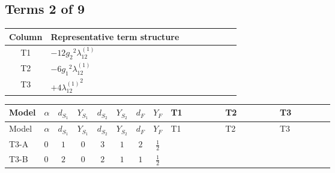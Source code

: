 \documentclass[8pt]{article}
\begin{document}
\begin{landscape}
\subsection*{Terms 2 of 9}
\begin{center}
\begin{tabular}{@{}c >{\raggedright\arraybackslash}p{0.82\linewidth}@{}}
\toprule
Column & Representative term structure \\
\midrule
T1 & \(\displaystyle -12 {g_2}^2 {\lambda_{12}^{(1)}}\) \\
\midrule
T2 & \(\displaystyle -6 {g_1}^2 {\lambda_{12}^{(1)}}\) \\
\midrule
T3 & \(\displaystyle +4 {\lambda_{12}^{(1)}}^2\) \\
\midrule
\bottomrule
\end{tabular}
\end{center}
\smallskip
\tiny
\begin{longtable}{@{}llcccccc >{\raggedright\arraybackslash}p{0.21\linewidth} >{\raggedright\arraybackslash}p{0.21\linewidth} >{\raggedright\arraybackslash}p{0.21\linewidth}@{}}
\toprule
Model & $\alpha$ & $d_{S_1}$ & $Y_{S_1}$ & $d_{S_2}$ & $Y_{S_2}$ & $d_F$ & $Y_F$ & T1 & T2 & T3 \\
\midrule
\endfirsthead
\toprule
Model & $\alpha$ & $d_{S_1}$ & $Y_{S_1}$ & $d_{S_2}$ & $Y_{S_2}$ & $d_F$ & $Y_F$ & T1 & T2 & T3 \\
\midrule
\endhead
T3-A & $0$ & $1$ & $0$ & $3$ & $1$ & $2$ & $\frac{1}{2}$ & \scriptsize\adjustbox{max width=\linewidth}{$\begin{gathered} -12 {g_2}^2 {\lambda_{12}^{(1)}}\end{gathered}$} & \scriptsize\adjustbox{max width=\linewidth}{$\begin{gathered} -6 {g_1}^2 {\lambda_{12}^{(1)}}\end{gathered}$} & \scriptsize\adjustbox{max width=\linewidth}{$\begin{gathered} +4 {\lambda_{12}^{(1)}}^2\end{gathered}$} \\
\midrule
T3-B & $0$ & $2$ & $0$ & $2$ & $1$ & $1$ & $\frac{1}{2}$ & \scriptsize\adjustbox{max width=\linewidth}{$\begin{gathered} -9 {g_2}^2 {\lambda_{12}^{(1)}}\end{gathered}$} & \scriptsize\adjustbox{max width=\linewidth}{$\begin{gathered} -6 {g_1}^2 {\lambda_{12}^{(1)}}\end{gathered}$} & \scriptsize\adjustbox{max width=\linewidth}{$\begin{gathered} +4 {\lambda_{12}^{(1)}}^2\end{gathered}$} \\

\end{longtable}
\end{landscape}
\end{document}

